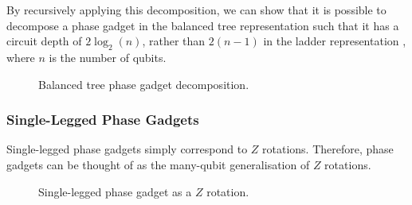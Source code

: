 By recursively applying this decomposition, we can show that it is possible to decompose a phase gadget in the balanced tree representation such that it has a circuit depth of $2\log_2(n)$, rather than $2(n-1)$ in the ladder representation \cite{Cowtan2019}, where $n$ is the number of qubits.

\begin{figure}[H]
    \centering
    \caption{Balanced tree phase gadget decomposition.}
    \label{balanced-tree}
\end{figure}

\subsubsection{Single-Legged Phase Gadgets}
Single-legged phase gadgets simply correspond to $Z$ rotations. Therefore, phase gadgets can be thought of as the many-qubit generalisation of $Z$ rotations.

\begin{figure}[H]
    \centering
    \caption{Single-legged phase gadget as a $Z$ rotation.}
    \label{phase-gadget-single-leg}
\end{figure}

